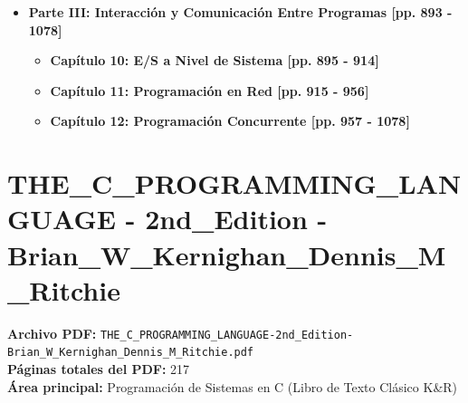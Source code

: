 \documentclass[11pt,a4paper]{article}
\begin{document}
\begin{itemize}
\begin{itemize}
\begin{itemize}
        \end{itemize}
        \item \textbf{Capítulo 9: Memoria Virtual [pp. 809 - 892]}
        \begin{itemize}
            \item 9.1 Direccionamiento Físico y Virtual [pp. 811 - 811]
            \item 9.2 Espacios de Direcciones [pp. 812 - 812]
            \item 9.3 La Memoria Virtual como una Herramienta para Caching [pp. 813 - 818]
            \item 9.4 La Memoria Virtual como una Herramienta para la Administración [pp. 819 - 819]
            \item 9.5 La Memoria Virtual como una Herramienta para la Protección [pp. 820 - 820]
            \item 9.6 Traducción de Direcciones (TLB, Tablas de Páginas de múltiples niveles) [pp. 821 - 832]
            \item 9.7 Caso de Estudio: El Sistema de Memoria Core i7 / Linux [pp. 833 - 840]
            \item 9.8 Mapeo de Memoria [pp. 841 - 845]
            \item 9.9 Asignación Dinámica de Memoria (Asignadores Explícitos/Implícitos, malloc/free, Fragmentación) [pp. 846 - 871]
            \item 9.10 Recolección de Basura y Errores de Memoria en C [pp. 872 - 892]
        \end{itemize}
    \end{itemize}

    \item \textbf{Parte III: Interacción y Comunicación Entre Programas [pp. 893 - 1078]}
    \begin{itemize}
        \item \textbf{Capítulo 10: E/S a Nivel de Sistema [pp. 895 - 914]}
        \item \textbf{Capítulo 11: Programación en Red [pp. 915 - 956]}
        \item \textbf{Capítulo 12: Programación Concurrente [pp. 957 - 1078]}
    \end{itemize}
\end{itemize}

\newpage

\section{THE\_C\_PROGRAMMING\_LANGUAGE - 2nd\_Edition - Brian\_W\_Kernighan\_Dennis\_M\_Ritchie}
\textbf{Archivo PDF:} \texttt{THE\_C\_PROGRAMMING\_LANGUAGE-2nd\_Edition-Brian\_W\_Kernighan\_Dennis\_M\_Ritchie.pdf} \\
\textbf{Páginas totales del PDF:} 217 \\
\textbf{Área principal:} Programación de Sistemas en C (Libro de Texto Clásico K\&R)
\end{document}
